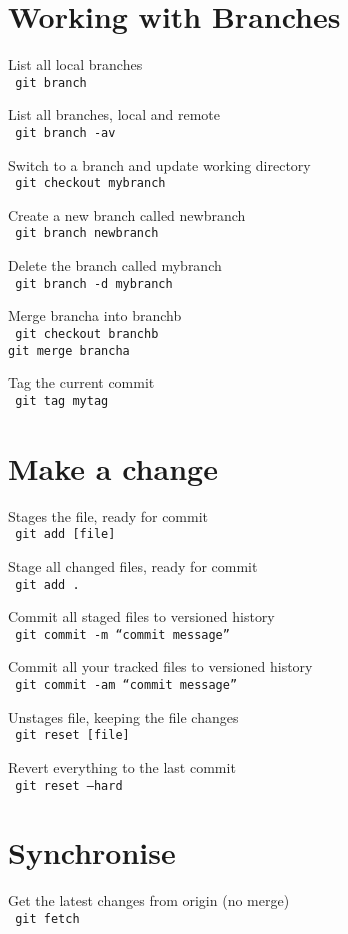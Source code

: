 \documentclass[a4paper, twoside, 11pt]{extarticle}
\begin{document}
\begin{multicols*}{2}
\section{Working with Branches}
List all local branches \\ \texttt{\color{blue} git branch}

List all branches, local and remote \\ \texttt{\color{blue} git branch -av}

Switch to a branch and update working directory \\ \texttt{\color{blue} git checkout mybranch}

Create a new branch called newbranch \\ \texttt{\color{blue} git branch newbranch}

Delete the branch called mybranch \\ \texttt{\color{blue} git branch -d mybranch}

Merge brancha into branchb \\ \texttt{\color{blue} git checkout branchb\\git merge brancha}

Tag the current commit \\ \texttt{\color{blue} git tag mytag}

\section{Make a change}
Stages the file, ready for commit \\ \texttt{\color{blue} git add [file]}

Stage all changed files, ready for commit \\ \texttt{\color{blue} git add .}

Commit all staged files to versioned history \\ \texttt{\color{blue} git commit -m “commit message”}

Commit all your tracked files to
versioned history \\ \texttt{\color{blue} git commit -am “commit message”}

Unstages file, keeping the file changes \\ \texttt{\color{blue} git reset [file]}

Revert everything to the last commit \\ \texttt{\color{blue} git reset --hard}

\section{Synchronise}
Get the latest changes from origin
(no merge) \\ \texttt{\color{blue} git fetch}


\end{multicols*}
\end{document}
